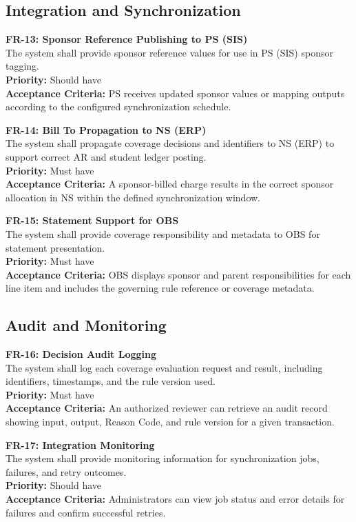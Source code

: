 \documentclass[12pt,a4paper]{article}
\begin{document}
\subsection{Integration and Synchronization}

\textbf{FR-13: Sponsor Reference Publishing to PS (SIS)}\\
The system shall provide sponsor reference values for use in PS (SIS) sponsor tagging.\\
\textbf{Priority:} Should have\\
\textbf{Acceptance Criteria:} PS receives updated sponsor values or mapping outputs according to the configured synchronization schedule.

\textbf{FR-14: Bill To Propagation to NS (ERP)}\\
The system shall propagate coverage decisions and identifiers to NS (ERP) to support correct AR and student ledger posting.\\
\textbf{Priority:} Must have\\
\textbf{Acceptance Criteria:} A sponsor-billed charge results in the correct sponsor allocation in NS within the defined synchronization window.

\textbf{FR-15: Statement Support for OBS}\\
The system shall provide coverage responsibility and metadata to OBS for statement presentation.\\
\textbf{Priority:} Must have\\
\textbf{Acceptance Criteria:} OBS displays sponsor and parent responsibilities for each line item and includes the governing rule reference or coverage metadata.

\subsection{Audit and Monitoring}

\textbf{FR-16: Decision Audit Logging}\\
The system shall log each coverage evaluation request and result, including identifiers, timestamps, and the rule version used.\\
\textbf{Priority:} Must have\\
\textbf{Acceptance Criteria:} An authorized reviewer can retrieve an audit record showing input, output, Reason Code, and rule version for a given transaction.

\textbf{FR-17: Integration Monitoring}\\
The system shall provide monitoring information for synchronization jobs, failures, and retry outcomes.\\
\textbf{Priority:} Should have\\
\textbf{Acceptance Criteria:} Administrators can view job status and error details for failures and confirm successful retries.
\end{document}
